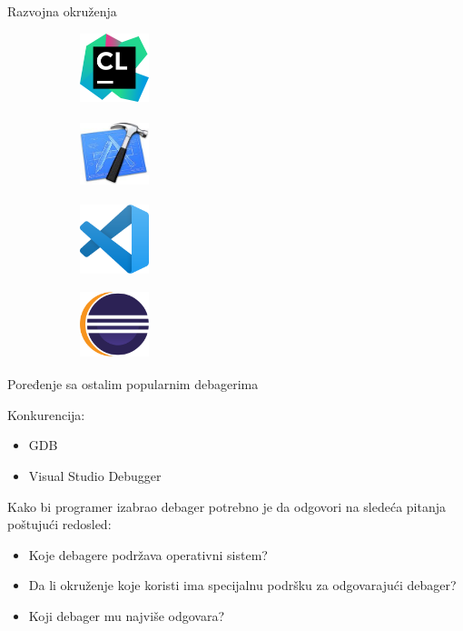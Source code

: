 \documentclass[bookmarks=true,bookmarksopen=true,pdfborder={0 0 0},pdfhighlight={/N},linkbordercolor={.5 .5 .5},implicit=false,unicode,xcolor={table}]{beamer}
\begin{document}
\begin{frame}{Razvojna okruženja}
\begin{figure}
	
	\begin{subfigure}{2cm}
		\includegraphics[width=2cm,height=2cm]{clion_logo}
	\end{subfigure}
	\begin{subfigure}{2cm}
		\includegraphics[width=2cm,height=2cm]{xcode_logo}
	\end{subfigure}
	\begin{subfigure}{2cm}
		\includegraphics[width=2cm,height=2cm]{visual_code}
	\end{subfigure}
	\begin{subfigure}{2cm}
		\includegraphics[width=2cm,height=2cm]{eclipse_logo}
	\end{subfigure}
\end{figure}
\end{frame}

\begin{frame}{Poređenje sa ostalim popularnim debagerima}
	
	Konkurencija:
	\begin{itemize}
		\item GDB
		\item Visual Studio Debugger
	\end{itemize}

	Kako bi programer izabrao debager potrebno je da odgovori na sledeća pitanja poštujući redosled:
	\begin{itemize}
		\item Koje debagere podržava operativni sistem?
		\item Da li okruženje koje koristi ima specijalnu podršku za odgovarajući debager?
		\item Koji debager mu najviše odgovara?
	\end{itemize}
	
\end{frame}
\end{document}
